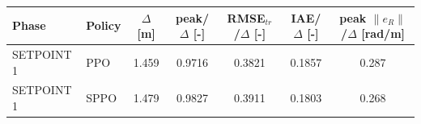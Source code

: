 \begin{tabular}{llccccc}
\toprule
Phase & Policy & $\Delta$ [m] & peak/$\Delta$ [-] & RMSE$_{tr}$/$\Delta$ [-] & IAE/$\Delta$ [-] & peak $\|e_R\|$/$\Delta$ [rad/m] \\
\midrule
SETPOINT 1 & PPO & 1.459 & 0.9716 & 0.3821 & 0.1857 & 0.287 \\
SETPOINT 1 & SPPO & 1.479 & 0.9827 & 0.3911 & 0.1803 & 0.268 \\
\bottomrule
\end{tabular}
